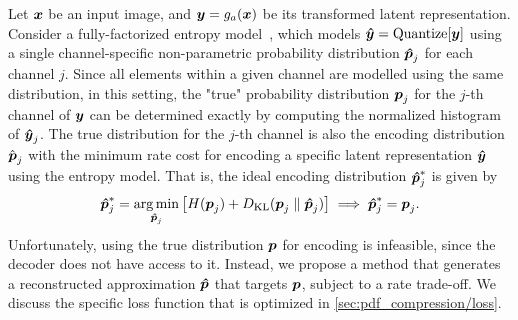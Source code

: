 Let ${\boldsymbol{x}}$ be an input image, and ${\boldsymbol{y}} = g_a({\boldsymbol{x}})$ be its transformed latent representation.
Consider a fully-factorized entropy model~\cite{balle2018variational}, which models ${\boldsymbol{\hat{y}}} = \operatorname{Quantize}[{\boldsymbol{y}}]$ using a single channel-specific non-parametric probability distribution ${\boldsymbol{\hat{p}}}_j$ for each channel $j$.
Since all elements within a given channel are modelled using the same distribution, in this setting, the "true" probability distribution ${\boldsymbol{p}}_j$ for the $j$-th channel of ${\boldsymbol{y}}$ can be determined exactly by computing the normalized histogram of ${\boldsymbol{\hat{y}}}_j$.
%
%
The true distribution for the $j$-th channel is also the encoding distribution $\hat{{\boldsymbol{p}}}_j$ with the minimum rate cost for encoding a specific latent representation ${\boldsymbol{\hat{y}}}$ using the entropy model.
That is, the ideal encoding distribution ${\boldsymbol{\hat{p}}}^*_j$ is given by
\begin{equation*}
  {\boldsymbol{\hat{p}}}^*_j = \operatorname*{arg\,min}_{{\boldsymbol{\hat{p}}}_j} \left[
    H({\boldsymbol{p}}_j) + D_{\mathrm{KL}}({\boldsymbol{p}}_j \parallel {\boldsymbol{\hat{p}}}_j)
  \right]
  \implies {\boldsymbol{\hat{p}}}^*_j = {\boldsymbol{p}}_j.
\end{equation*}
Unfortunately, using the true distribution ${\boldsymbol{p}}$ for encoding is infeasible, since the decoder does not have access to it.
Instead, we propose a method that generates a reconstructed approximation ${\boldsymbol{\hat{p}}}$ that targets ${\boldsymbol{p}}$, subject to a rate trade-off. %
We discuss the specific loss function that is optimized in \cref{sec:pdf_compression/loss}.

